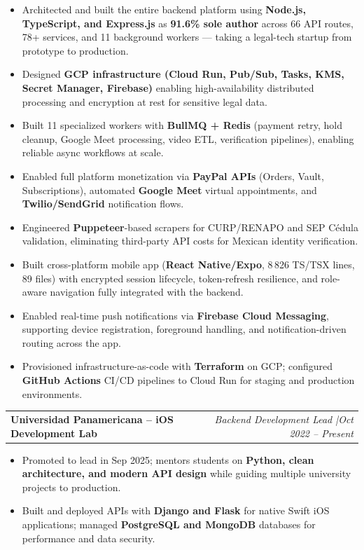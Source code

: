 \documentclass[10pt, letterpaper]{article}
\makeatletter
\newcommand{\entry}[2]{%
  \noindent\begin{tabular*}{\textwidth}{@{}l@{\extracolsep{\fill}}r@{}}
    #1 & #2
  \end{tabular*}}
\newenvironment{cvlist}{%
  \begin{itemize}[leftmargin=1.4em,itemsep=1pt,topsep=2pt,parsep=0pt]
}{\end{itemize}}
\makeatother
\begin{document}
\begin{cvlist}
  \item Architected and built the entire backend platform using \textbf{Node.js,
        TypeScript, and Express.js} as \textbf{91.6\% sole author} across 66 API
        routes, 78+ services, and 11 background workers --- taking a legal-tech
        startup from prototype to production.
  \item Designed \textbf{GCP infrastructure (Cloud Run, Pub/Sub, Tasks, KMS,
        Secret Manager, Firebase)} enabling high-availability distributed
        processing and encryption at rest for sensitive legal data.
  \item Built 11 specialized workers with \textbf{BullMQ + Redis} (payment retry,
        hold cleanup, Google Meet processing, video ETL, verification pipelines),
        enabling reliable async workflows at scale.
  \item Enabled full platform monetization via \textbf{PayPal APIs} (Orders,
        Vault, Subscriptions), automated \textbf{Google Meet} virtual appointments,
        and \textbf{Twilio/SendGrid} notification flows.
  \item Engineered \textbf{Puppeteer}-based scrapers for CURP/RENAPO and SEP
        C\'{e}dula validation, eliminating third-party API costs for Mexican
        identity verification.
  \item Built cross-platform mobile app (\textbf{React Native/Expo}, 8\,826
        TS/TSX lines, 89 files) with encrypted session lifecycle, token-refresh
        resilience, and role-aware navigation fully integrated with the backend.
  \item Enabled real-time push notifications via \textbf{Firebase Cloud Messaging},
        supporting device registration, foreground handling, and
        notification-driven routing across the app.
  \item Provisioned infrastructure-as-code with \textbf{Terraform} on GCP;
        configured \textbf{GitHub Actions} CI/CD pipelines to Cloud Run for
        staging and production environments.
\end{cvlist}

\medskip

\entry{\textbf{Universidad Panamericana -- iOS Development Lab}}{%
  \textit{Backend Development Lead \enspace|\enspace Oct 2022 -- Present}}

\begin{cvlist}
  \item Promoted to lead in Sep 2025; mentors students on \textbf{Python, clean
        architecture, and modern API design} while guiding multiple university
        projects to production.
  \item Built and deployed APIs with \textbf{Django and Flask} for native Swift
        iOS applications; managed \textbf{PostgreSQL and MongoDB} databases for
        performance and data security.
\end{cvlist}
\end{document}
